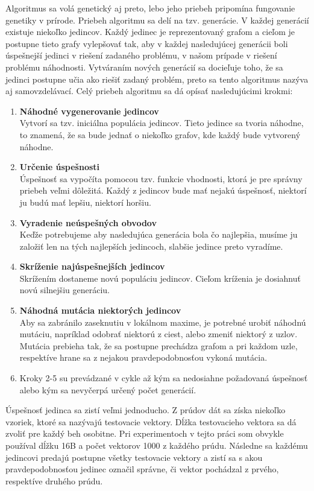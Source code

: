 Algoritmus sa volá genetický aj preto, lebo jeho priebeh pripomína fungovanie genetiky v prírode. Priebeh algoritmu sa delí na tzv. generácie. V každej generácií existuje niekoľko jedincov. Každý jedinec je reprezentovaný grafom a cieľom je postupne tieto grafy vylepšovať tak, aby v každej nasledujúcej generácii boli úspešnejší jedinci v riešení zadaného problému, v našom prípade v riešení problému náhodnosti. Vytváraním nových generácií sa docieľuje toho, že sa jedinci postupne učia ako riešiť zadaný problém, preto sa tento algoritmus nazýva aj samovzdelávací. Celý priebeh algoritmu sa dá opísať nasledujúcimi krokmi:\vspace{-10pt}
\begin{enumerate}
	\item \textbf{Náhodné vygenerovanie jedincov}\\Vytvorí sa tzv. iniciálna populácia jedincov. Tieto jedince sa tvoria náhodne, to znamená, že sa bude jednať o niekoľko grafov, kde každý bude vytvorený náhodne.
	\item \textbf{Určenie úspešnosti}\\Úspešnosť sa vypočíta pomocou tzv. funkcie vhodnosti, ktorá je pre správny priebeh veľmi dôležitá. Každý z jedincov bude mať nejakú úspešnosť, niektorí ju budú mať lepšiu, niektorí horšiu.
	\item \textbf{Vyradenie neúspešných obvodov}\\Keďže potrebujeme aby nasledujúca generácia bola čo najlepšia, musíme ju založiť len na tých najlepších jedincoch, slabšie jedince preto vyradíme.
	\item \textbf{Skríženie najúspešnejších jedincov}\\Skrížením dostaneme novú populáciu jedincov. Cieľom kríženia je dosiahnuť novú silnejšiu generáciu.
	\item \textbf{Náhodná mutácia niektorých jedincov}\\Aby sa zabránilo zaseknutiu v lokálnom maxime, je potrebné urobiť náhodnú mutáciu, napríklad odobrať niektorú z ciest, alebo zmeniť niektorý z uzlov. Mutácia prebieha tak, že sa postupne prechádza grafom a pri každom uzle, respektíve hrane sa z nejakou pravdepodobnosťou vykoná mutácia.
	\item Kroky 2-5 su prevádzané v cykle až kým sa nedosiahne požadovaná úspešnosť alebo kým sa nevyčerpá určený počet generácií.
\end{enumerate}
Úspešnosť jedinca sa zistí veľmi jednoducho. Z prúdov dát sa získa niekoľko vzoriek, ktoré sa nazývajú testovacie vektory. Dĺžka testovacieho vektora sa dá zvoliť pre každý beh osobitne. Pri experimentoch v tejto práci som obvykle používal dĺžku 16B a počet vektorov 1000 z každého prúdu. Následne sa každému jedincovi predajú postupne všetky testovacie vektory a zistí sa s akou pravdepodobnosťou jedinec označil správne, či vektor pochádzal z prvého, respektíve druhého prúdu. 

